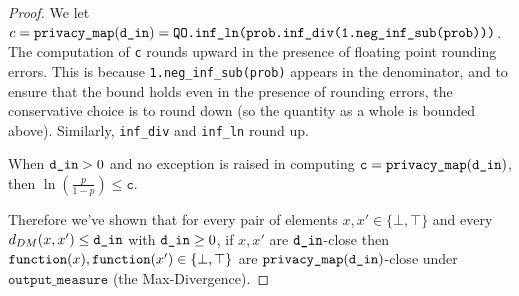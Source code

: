 \documentclass{article}
\begin{document}
\begin{proof}
We let $c = \texttt{privacy\_map}(\texttt{d\_in}) = \texttt{QO.inf\_ln(prob.inf\_div(1.neg\_inf\_sub(prob)))}$.
The computation of \texttt{c} rounds upward in the presence of floating point rounding errors. 
This is because \texttt{1.neg\_inf\_sub(prob)} appears in the denominator, and to ensure that the bound holds even in the presence of rounding errors, the conservative choice is to round down (so the quantity as a whole is bounded above). 
Similarly, \texttt{inf\_div} and \texttt{inf\_ln} round up. 

When $\texttt{d\_in} > 0$ and no exception is raised in computing $\texttt{c} = \texttt{privacy\_map}(\texttt{d\_in})$, then $\ln\left(\frac{p}{1 - p}\right) \leq \texttt{c}$. 

Therefore we've shown that for every pair of elements $x, x' \in \{\bot, \top\}$ and every $d_{DM}(x, x') \le \texttt{d\_in}$ with $\texttt{d\_in} \ge 0$, 
if $x, x'$ are $\texttt{d\_in}$-close then $\texttt{function}(x),\texttt{function}(x') \in \{\bot, \top\}$ are $\texttt{privacy\_map}(\texttt{d\_in})$-close under $\texttt{output\_measure}$ (the Max-Divergence).
\end{proof}




\end{document}

